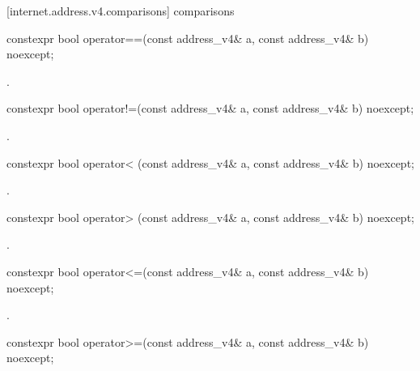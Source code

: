 [internet.address.v4.comparisons]{ comparisons}

%
\begin{itemdecl}
constexpr bool operator==(const address_v4& a, const address_v4& b) noexcept;
\end{itemdecl}

\begin{itemdescr}
\pnum
\returns {}.
\end{itemdescr}

%
\begin{itemdecl}
constexpr bool operator!=(const address_v4& a, const address_v4& b) noexcept;
\end{itemdecl}

\begin{itemdescr}
\pnum
\returns {}.
\end{itemdescr}

%
\begin{itemdecl}
constexpr bool operator< (const address_v4& a, const address_v4& b) noexcept;
\end{itemdecl}

\begin{itemdescr}
\pnum
\returns {}.
\end{itemdescr}

%
\begin{itemdecl}
constexpr bool operator> (const address_v4& a, const address_v4& b) noexcept;
\end{itemdecl}

\begin{itemdescr}
\pnum
\returns {}.
\end{itemdescr}

%
\begin{itemdecl}
constexpr bool operator<=(const address_v4& a, const address_v4& b) noexcept;
\end{itemdecl}

\begin{itemdescr}
\pnum
\returns {}.
\end{itemdescr}

%
\begin{itemdecl}
constexpr bool operator>=(const address_v4& a, const address_v4& b) noexcept;
\end{itemdecl}

